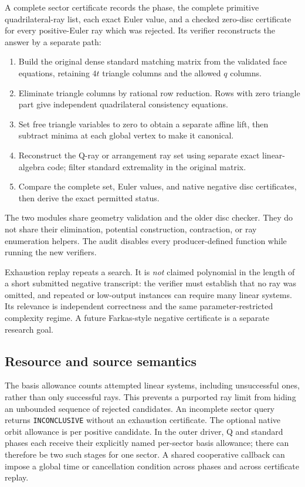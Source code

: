 \documentclass[11pt]{article}
\theoremstyle{definition}
\theoremstyle{remark}
\newcommand{\code}[1]{\texttt{#1}}
\begin{document}
A complete sector certificate records the phase, the complete primitive
quadrilateral-ray list, each exact Euler value, and a checked zero-disc
certificate for every positive-Euler ray which was rejected. Its verifier
reconstructs the answer by a separate path:
\begin{enumerate}
\item Build the original dense standard matching matrix from the validated
face equations, retaining $4t$ triangle columns and the allowed $q$ columns.
\item Eliminate triangle columns by rational row reduction. Rows with zero
triangle part give independent quadrilateral consistency equations.
\item Set free triangle variables to zero to obtain a separate affine lift,
then subtract minima at each global vertex to make it canonical.
\item Reconstruct the Q-ray or arrangement ray set using separate exact
linear-algebra code; filter standard extremality in the original matrix.
\item Compare the complete set, Euler values, and native negative disc
certificates, then derive the exact permitted status.
\end{enumerate}
The two modules share geometry validation and the older disc checker. They
do not share their elimination, potential construction, contraction, or ray
enumeration helpers. The audit disables every producer-defined function
while running the new verifiers.

Exhaustion replay repeats a search. It is \emph{not} claimed polynomial in the
length of a short submitted negative transcript: the verifier must establish
that no ray was omitted, and repeated or low-output instances can require
many linear systems. Its relevance is independent correctness and the same
parameter-restricted complexity regime. A future Farkas-style negative
certificate is a separate research goal.

\subsection{Resource and source semantics}

The basis allowance counts attempted linear systems, including unsuccessful
ones, rather than only successful rays. This prevents a purported ray limit
from hiding an unbounded sequence of rejected candidates. An incomplete
sector query returns \code{INCONCLUSIVE} without an exhaustion certificate.
The optional native orbit allowance is per positive candidate. In the outer
driver, Q and standard phases each receive their explicitly named
per-sector basis allowance; there can therefore be two such stages for one
sector. A shared cooperative callback can impose a global time or cancellation
condition across phases and across certificate replay.
\end{document}
